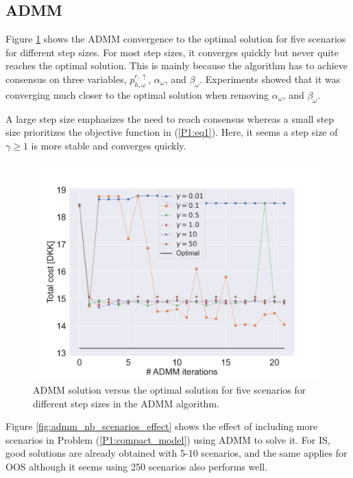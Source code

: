 \subsection{ADMM}

Figure \ref{fig:admm_vs_normal_solution} shows the ADMM convergence to the optimal solution for five scenarios for different step sizes. For most step sizes, it converges quickly but never quite reaches the optimal solution. This is mainly because the algorithm has to achieve consensus on three variables, $p_{h,\omega}^{r,\uparrow}$, $\alpha_{\omega}$, and $\beta_{\omega}$. Experiments showed that it was converging much closer to the optimal solution when removing $\alpha_{\omega}$, and $\beta_{\omega}$.

A large step size emphasizes the need to reach consensus whereas a small step size prioritizes the objective function in (\ref{P1:eq1}). Here, it seems a step size of $\gamma \geq 1$ is more stable and converges quickly.

\begin{figure}[!t]
    \centering
    \includegraphics[width=\columnwidth]{../figures/admm_vs_normal_solution.png}
    \caption{ADMM solution versus the optimal solution for five scenarios for different step sizes in the ADMM algorithm.}
    \label{fig:admm_vs_normal_solution}
\end{figure}

Figure \ref{fig:admm_nb_scenarios_effect} shows the effect of including more scenarios in Problem (\ref{P1:compact_model}) using ADMM to solve it. For IS, good solutions are already obtained with 5-10 scenarios, and the same applies for OOS although it seems using 250 scenarios also performs well.

